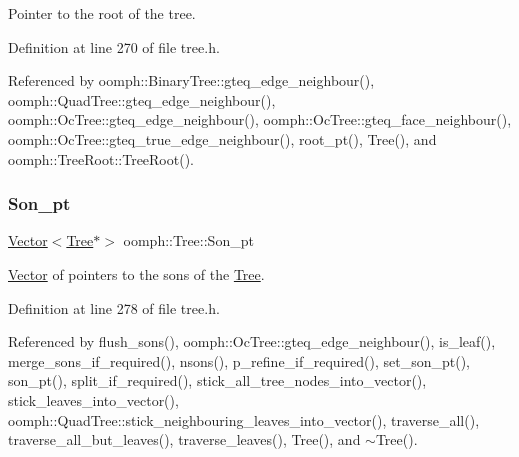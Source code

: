Pointer to the root of the tree. 



Definition at line 270 of file tree.\+h.



Referenced by oomph\+::\+Binary\+Tree\+::gteq\+\_\+edge\+\_\+neighbour(), oomph\+::\+Quad\+Tree\+::gteq\+\_\+edge\+\_\+neighbour(), oomph\+::\+Oc\+Tree\+::gteq\+\_\+edge\+\_\+neighbour(), oomph\+::\+Oc\+Tree\+::gteq\+\_\+face\+\_\+neighbour(), oomph\+::\+Oc\+Tree\+::gteq\+\_\+true\+\_\+edge\+\_\+neighbour(), root\+\_\+pt(), Tree(), and oomph\+::\+Tree\+Root\+::\+Tree\+Root().

\mbox{\label{classoomph_1_1Tree_ac6b9069f345b296654421604c5569af6}} 
\subsubsection{\texorpdfstring{Son\+\_\+pt}{Son\_pt}}
{\footnotesize\ttfamily \hyperlink{classoomph_1_1Vector}{Vector}$<$\hyperlink{classoomph_1_1Tree}{Tree}$\ast$$>$ oomph\+::\+Tree\+::\+Son\+\_\+pt\hspace{0.3cm}{\ttfamily [protected]}}



\hyperlink{classoomph_1_1Vector}{Vector} of pointers to the sons of the \hyperlink{classoomph_1_1Tree}{Tree}. 



Definition at line 278 of file tree.\+h.



Referenced by flush\+\_\+sons(), oomph\+::\+Oc\+Tree\+::gteq\+\_\+edge\+\_\+neighbour(), is\+\_\+leaf(), merge\+\_\+sons\+\_\+if\+\_\+required(), nsons(), p\+\_\+refine\+\_\+if\+\_\+required(), set\+\_\+son\+\_\+pt(), son\+\_\+pt(), split\+\_\+if\+\_\+required(), stick\+\_\+all\+\_\+tree\+\_\+nodes\+\_\+into\+\_\+vector(), stick\+\_\+leaves\+\_\+into\+\_\+vector(), oomph\+::\+Quad\+Tree\+::stick\+\_\+neighbouring\+\_\+leaves\+\_\+into\+\_\+vector(), traverse\+\_\+all(), traverse\+\_\+all\+\_\+but\+\_\+leaves(), traverse\+\_\+leaves(), Tree(), and $\sim$\+Tree().

\mbox{\label{classoomph_1_1Tree_a83fe7895af25c9f60062c081fc51967c}} 
